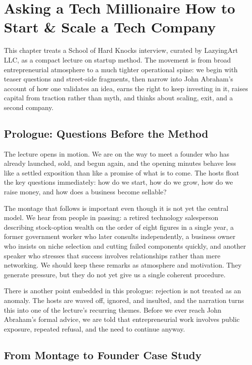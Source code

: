 \chapter{Asking a Tech Millionaire How to Start \& Scale a Tech Company}

This chapter treats a School of Hard Knocks interview, curated by LazyingArt LLC, as a compact lecture on startup method. The movement is from broad entrepreneurial atmosphere to a much tighter operational spine: we begin with teaser questions and street-side fragments, then narrow into John Abraham's account of how one validates an idea, earns the right to keep investing in it, raises capital from traction rather than myth, and thinks about scaling, exit, and a second company.

\section{Prologue: Questions Before the Method}

The lecture opens in motion. We are on the way to meet a founder who has already launched, sold, and begun again, and the opening minutes behave less like a settled exposition than like a promise of what is to come. The hosts float the key questions immediately: how do we start, how do we grow, how do we raise money, and how does a business become sellable?

The montage that follows is important even though it is not yet the central model. We hear from people in passing: a retired technology salesperson describing stock-option wealth on the order of eight figures in a single year, a former government worker who later consults independently, a business owner who insists on niche selection and cutting failed components quickly, and another speaker who stresses that success involves relationships rather than mere networking. We should keep these remarks as atmosphere and motivation. They generate pressure, but they do not yet give us a single coherent procedure.

There is another point embedded in this prologue: rejection is not treated as an anomaly. The hosts are waved off, ignored, and insulted, and the narration turns this into one of the lecture's recurring themes. Before we ever reach John Abraham's formal advice, we are told that entrepreneurial work involves public exposure, repeated refusal, and the need to continue anyway.

\section{From Montage to Founder Case Study}

